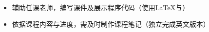 \documentclass[10pt,a4paper]{altacv}
\begin{document}
\divider

\vspace{0.10cm}
\begin{itemize}
    \item 辅助任课老师，编写课件及展示程序代码（使用\LaTeX{}与）
    \item 依据课程内容与进度，需及时制作课程笔记（独立完成英文版本）
\end{itemize}

\end{document}
